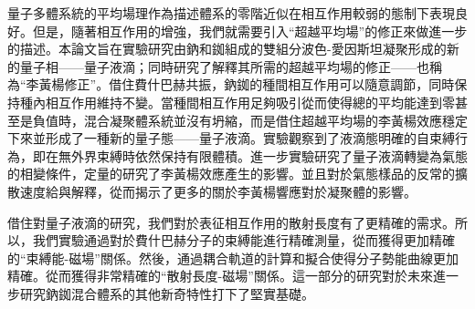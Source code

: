 量子多體系統的平均場理作為描述體系的零階近似在相互作用較弱的態制下表現良好。但是，隨著相互作用的增強，我們就需要引入“超越平均場”的修正來做進一步的描述。本論文旨在實驗研究由鈉和銣組成的雙組分波色-愛因斯坦凝聚形成的新的量子相——量子液滴；同時研究了解釋其所需的超越平均場的修正——也稱為“李黃楊修正”。借住費什巴赫共振，鈉銣的種間相互作用可以隨意調節，同時保持種內相互作用維持不變。當種間相互作用足夠吸引從而使得總的平均能達到零甚至是負值時，混合凝聚體系統並沒有坍縮，而是借住超越平均場的李黃楊效應穩定下來並形成了一種新的量子態——量子液滴。實驗觀察到了液滴態明確的自束縛行為，即在無外界束縛時依然保持有限體積。進一步實驗研究了量子液滴轉變為氣態的相變條件，定量的研究了李黃楊效應產生的影響。並且對於氣態樣品的反常的擴散速度給與解釋，從而揭示了更多的關於李黃楊響應對於凝聚體的影響。

借住對量子液滴的研究，我們對於表征相互作用的散射長度有了更精確的需求。所以，我們實驗通過對於費什巴赫分子的束縛能進行精確測量，從而獲得更加精確的“束縛能-磁場”關係。然後，通過耦合軌道的計算和擬合使得分子勢能曲線更加精確。從而獲得非常精確的“散射長度-磁場”關係。這一部分的研究對於未來進一步研究鈉銣混合體系的其他新奇特性打下了堅實基礎。